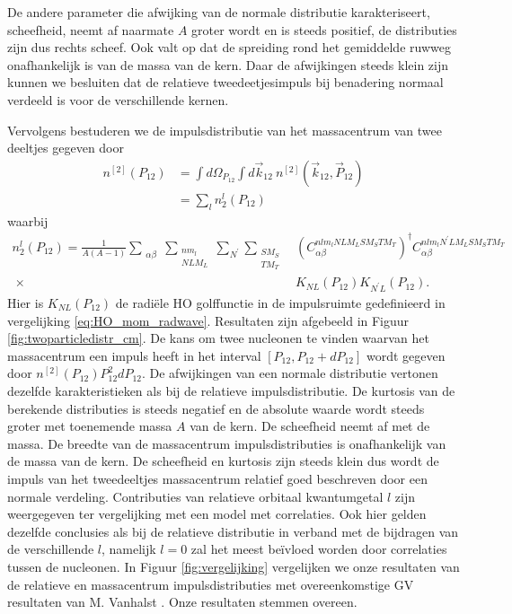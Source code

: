 \documentclass[11pt,twoside]{book}
\begin{document}
De andere parameter die afwijking van de normale distributie karakteriseert, scheefheid, neemt af naarmate $A$ groter wordt en is steeds positief, de distributies zijn dus rechts scheef. 
Ook valt op dat de spreiding rond het gemiddelde ruwweg onafhankelijk is van de massa van de kern. Daar de afwijkingen steeds klein zijn kunnen we besluiten dat de relatieve tweedeetjesimpuls bij benadering normaal verdeeld is voor de verschillende kernen.

Vervolgens bestuderen we de impulsdistributie van het massacentrum van twee deeltjes gegeven door 
\begin{align} \label{eq:cm_two}
n^{[2]}(P_{12}) & = \int d\Omega_{P_{12}}\int d\vec{k}_{12}\ n^{[2]}(\vec{k}_{12},\vec{P}_{12}) \nonumber \\
				 & = \sum_{l}  n_2^{l}(P_{12})
\end{align}
waarbij
\begin{align*} 
n_2^{l}(P_{12}) = \frac{1}{A(A-1)} \sum_{\substack{\alpha \beta }} \sum_{\substack{nm_l \\ NLM_L}} \sum_{N^{\prime}} \sum_{\substack{S M_S \\T M_T}} &  \left( C_{\alpha \beta}^{nlm_l NLM_L  S M_S T M_T} \right)^\dagger  C_{\alpha \beta}^{ n lm_l N^{\prime}LM_L  S M_S T M_T} \\ \ \times & K_{NL}(P_{12}) K_{N^{\prime} L}(P_{12}). 
\end{align*}
Hier is $K_{NL}(P_{12})$ de radi\"{e}le HO golffunctie in de impulsruimte gedefinieerd in vergelijking \eqref{eq:HO_mom_radwave}.
Resultaten zijn afgebeeld in Figuur \ref{fig:twoparticledistr_cm}. De kans om twee nucleonen te vinden waarvan het massacentrum een impuls heeft in het interval $[ P_{12}, P_{12}+ dP_{12} ]$ wordt gegeven door $n^{[2]}(P_{12})P_{12}^2dP_{12}$. De afwijkingen van een normale distributie vertonen dezelfde karakteristieken als bij de relatieve impulsdistributie. De kurtosis van de berekende distributies is steeds negatief en de absolute waarde wordt steeds groter met toenemende massa $A$ van de kern. De scheefheid neemt af met de massa. De breedte van de massacentrum impulsdistributies is onafhankelijk van de massa van de kern. De scheefheid en kurtosis zijn steeds klein dus wordt de impuls van het tweedeeltjes massacentrum relatief goed beschreven door een normale verdeling.
Contributies van relatieve orbitaal kwantumgetal $l$ zijn weergegeven ter vergelijking met een model met correlaties. Ook hier gelden dezelfde conclusies als bij de relatieve distributie in verband met de bijdragen van de verschillende $l$, namelijk $l=0$ zal het meest be\"{i}vloed worden door correlaties tussen de nucleonen. 
In Figuur \ref{fig:vergelijking} vergelijken we onze resultaten van de relatieve en massacentrum impulsdistributies met overeenkomstige GV resultaten van M. Vanhalst \cite{maarten}. Onze resultaten stemmen overeen.
\end{document}
